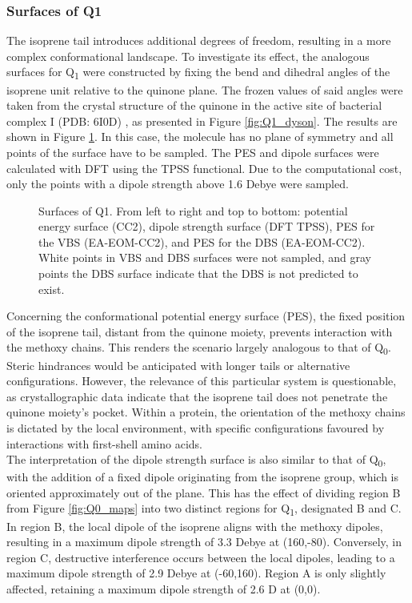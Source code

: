 \subsubsection{Surfaces of Q1}

The isoprene tail introduces additional degrees of freedom, resulting in a more complex conformational landscape. To investigate its effect, the analogous surfaces for Q\textsubscript{1} were constructed by fixing the bend and dihedral angles of the isoprene unit relative to the quinone plane. The frozen values of said angles were taken from the crystal structure of the quinone in the active site of bacterial complex I (PDB: 6I0D) \cite{gutierrez2020key}, as presented in Figure \ref{fig:Q1_dyson}. The results are shown in Figure \ref{fig:Q1_maps}. In this case, the molecule has no plane of symmetry and all points of the surface have to be sampled. The PES and dipole surfaces were calculated with DFT using the TPSS functional. Due to the computational cost, only the points with a dipole strength above 1.6 Debye were sampled.\\

 \begin{figure}[ht!]
  \centering
  \small
  
  \caption[Surfaces of Q1]{Surfaces of Q1. From left to right and top to bottom: potential energy surface (CC2), dipole strength surface (DFT TPSS), PES for the VBS (EA-EOM-CC2), and PES for the DBS (EA-EOM-CC2). White points in VBS and DBS surfaces were not sampled, and gray points the DBS surface indicate that the DBS is not predicted to exist. \label{fig:Q1_maps}}
\end{figure}

Concerning the conformational potential energy surface (PES), the fixed position of the isoprene tail, distant from the quinone moiety, prevents interaction with the methoxy chains. This renders the scenario largely analogous to that of Q\textsubscript{0}. Steric hindrances would be anticipated with longer tails or alternative configurations. However, the relevance of this particular system is questionable, as crystallographic data \cite{taguchi2013conformational} indicate that the isoprene tail does not penetrate the quinone moiety's pocket. Within a protein, the orientation of the methoxy chains is dictated by the local environment, with specific configurations favoured by interactions with first-shell amino acids.\\

The interpretation of the dipole strength surface is also similar to that of Q\textsubscript{0}, with the addition of a fixed dipole originating from the isoprene group, which is oriented approximately out of the plane. This has the effect of dividing region B from Figure \ref{fig:Q0_maps} into two distinct regions for Q\textsubscript{1}, designated B and C. In region B, the local dipole of the isoprene aligns with the methoxy dipoles, resulting in a maximum dipole strength of 3.3 Debye at (160,-80). Conversely, in region C, destructive interference occurs between the local dipoles, leading to a maximum dipole strength of 2.9 Debye at (-60,160). Region A is only slightly affected, retaining a maximum dipole strength of 2.6 D at (0,0).\\

